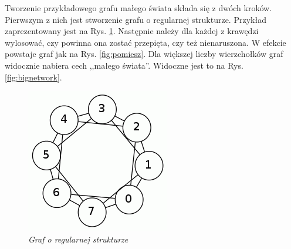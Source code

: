 \documentclass[a4paper, 12pt]{article}
\begin{document}
Tworzenie przykładowego grafu małego świata składa się z dwóch kroków. Pierwszym z nich jest stworzenie grafu o regularnej strukturze. Przykład zaprezentowany jest na Rys. \ref{fig:regul}. Następnie należy dla każdej z krawędzi wylosować, czy powinna ona zostać przepięta, czy też nienaruszona. W efekcie powstaje graf jak na Rys. \ref{fig:pomiesz}. Dla większej liczby wierzchołków graf widocznie nabiera cech ,,małego świata''. Widoczne jest to na Rys. \ref{fig:bignetwork}.

\begin{figure}[ht]
\begin{minipage}[b]{0.45\linewidth}
\centering
\includegraphics[width=\textwidth]{regularny.png}
\caption{\em Graf o regularnej strukturze}
\label{fig:regul}
\end{minipage}
\hspace{0.5cm}
\begin{minipage}[b]{0.45\linewidth}
\centering

\end{minipage}
\end{figure}
\end{document}
